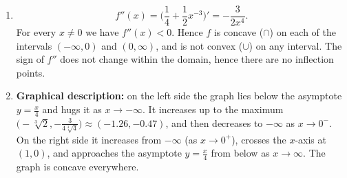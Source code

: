 \begin{solution}
\begin{enumerate}
  \item
  \[ f''(x)=\Big(\frac14+\frac12x^{-3}\Big)'=-\frac{3}{2x^4}. \]
  For every $x\neq 0$ we have $f''(x)<0$. Hence $f$ is concave ($\cap$) on each of the intervals $(-\infty,0)$ and $(0,\infty)$, and is not convex ($\cup$) on any interval. The sign of $f''$ does not change within the domain, hence there are no inflection points.

  \item \textbf{Graphical description:} on the left side the graph lies below the asymptote $y=\frac{x}{4}$ and hugs it as $x\to-\infty$. It increases up to the maximum $\big(-\sqrt[3]{2},-\frac{3}{4\sqrt[3]{4}}\big)\approx(-1.26,-0.47)$, and then decreases to $-\infty$ as $x\to0^-$. On the right side it increases from $-\infty$ (as $x\to0^+$), crosses the $x$-axis at $(1,0)$, and approaches the asymptote $y=\frac{x}{4}$ from below as $x\to\infty$. The graph is concave everywhere.
\end{enumerate}
\end{solution}
